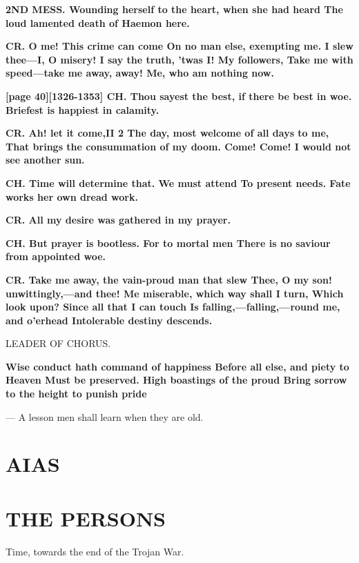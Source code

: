\documentclass[11pt,letter]{book}
\begin{document}
\par \textbf{2ND MESS. Wounding herself to the heart, when she had heard The loud lamented death of Haemon here.}
\par 

\par \textbf{CR. O me! This crime can come On no man else, exempting me. I slew thee—I, O misery! I say the truth, ’twas I! My followers, Take me with speed—take me away, away! Me, who am nothing now.}
\par 

\par \textbf{[page 40][1326-1353] CH. Thou sayest the best, if there be best in woe. Briefest is happiest in calamity.}
\par 

\par \textbf{CR. Ah! let it come,II 2 The day, most welcome of all days to me, That brings the consummation of my doom. Come! Come! I would not see another sun.}
\par 

\par \textbf{CH. Time will determine that. We must attend To present needs. Fate works her own dread work.}
\par 

\par \textbf{CR. All my desire was gathered in my prayer.}
\par 

\par \textbf{CH. But prayer is bootless. For to mortal men There is no saviour from appointed woe.}
\par 

\par \textbf{CR. Take me away, the vain-proud man that slew Thee, O my son! unwittingly,—and thee! Me miserable, which way shall I turn, Which look upon? Since all that I can touch Is falling,—falling,—round me, and o’erhead Intolerable destiny descends.}
\par 

\par  LEADER OF CHORUS.

\par \textbf{Wise conduct hath command of happiness Before all else, and piety to Heaven Must be preserved. High boastings of the proud Bring sorrow to the height to punish pride}
\par  — A lesson men shall learn when they are old.
\section{AIAS}\section{THE PERSONS} 
\par  Time, towards the end of the Trojan War.
\end{document}
